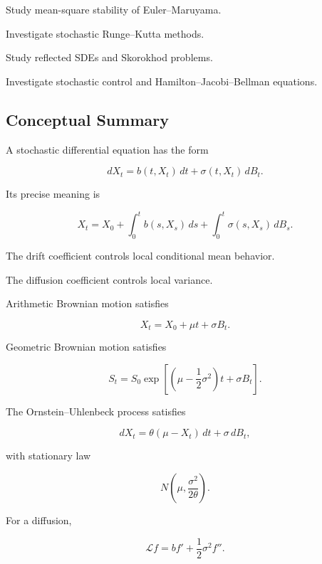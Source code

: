 \begin{exercise}[4]
Study mean-square stability of Euler--Maruyama.
\end{exercise}

\begin{exercise}[4]
Investigate stochastic Runge--Kutta methods.
\end{exercise}

\begin{exercise}[4]
Study reflected SDEs and Skorokhod problems.
\end{exercise}

\begin{exercise}[4]
Investigate stochastic control and Hamilton--Jacobi--Bellman equations.
\end{exercise}

\subsection{Conceptual Summary}
\label{subsec:sde-summary}

A stochastic differential equation has the form

\[
\boxed{
dX_t
=
b(t,X_t)\,dt
+
\sigma(t,X_t)\,dB_t.
}
\]

Its precise meaning is

\[
\boxed{
X_t
=
X_0
+
\int_0^t
b(s,X_s)\,ds
+
\int_0^t
\sigma(s,X_s)\,dB_s.
}
\]

The drift coefficient controls local conditional mean behavior.

The diffusion coefficient controls local variance.

Arithmetic Brownian motion satisfies

\[
\boxed{
X_t
=
X_0+\mu t+\sigma B_t.
}
\]

Geometric Brownian motion satisfies

\[
\boxed{
S_t
=
S_0
\exp
\left[
\left(
\mu-\frac12\sigma^2
\right)t
+
\sigma B_t
\right].
}
\]

The Ornstein--Uhlenbeck process satisfies

\[
\boxed{
dX_t
=
\theta(\mu-X_t)\,dt
+
\sigma\,dB_t,
}
\]

with stationary law

\[
\boxed{
N
\left(
\mu,
\frac{\sigma^2}{2\theta}
\right).
}
\]

For a diffusion,

\[
\boxed{
\mathcal{L}f
=
bf'
+
\frac12\sigma^2f''.
}
\]

